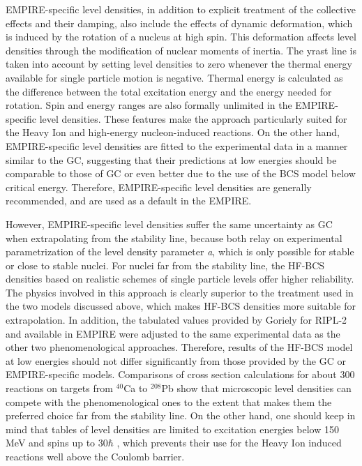 EMPIRE-specific level densities, in addition to explicit treatment of the
collective effects and their damping, also include the effects of dynamic
deformation, which is induced by the rotation of a nucleus at high spin.
This deformation affects level densities through the modification of nuclear
moments of inertia. The yrast line is taken into account by setting level
densities to zero whenever the thermal energy available for single particle
motion is negative. Thermal energy is calculated as the difference between
the total excitation energy and the energy needed for rotation. Spin and
energy ranges are also formally unlimited in the EMPIRE-specific level
densities. These features make the approach particularly suited for the
Heavy Ion and high-energy nucleon-induced reactions. On the other hand,
EMPIRE-specific level densities are fitted to the experimental data in a
manner similar to the GC, suggesting that their predictions at low energies
should be comparable to those of GC or even better due to the use of the BCS
model below critical energy. Therefore, EMPIRE-specific level densities are
generally recommended, and are used as a default in the EMPIRE.

However, EMPIRE-specific level densities suffer the same uncertainty as GC
when extrapolating from the stability line, because both relay on
experimental parametrization of the level density parameter \textit{a},
which is only possible for stable or close to stable nuclei. For nuclei far
from the stability line, the HF-BCS densities based on realistic schemes of
single particle levels offer higher reliability. The physics involved in
this approach is clearly superior to the treatment used in the two models
discussed above, which makes HF-BCS densities more suitable for
extrapolation. In addition, the tabulated values provided by Goriely for
RIPL-2 and available in EMPIRE were adjusted to the same experimental data
as the other two phenomenological approaches. Therefore, results of the
HF-BCS model at low energies should not differ significantly from those
provided by the GC or EMPIRE-specific models. Comparisons of cross section
calculations for about 300 reactions on targets from $^{40}$Ca to $^{208}$Pb
show that microscopic level densities can compete with the phenomenological
ones to the extent that makes them the preferred choice far from the
stability line. On the other hand, one should keep in mind that tables of
level densities are limited to excitation energies below 150 MeV and spins
up to 30$\hbar$ , which prevents their use for the Heavy Ion induced
reactions well above the Coulomb barrier.

